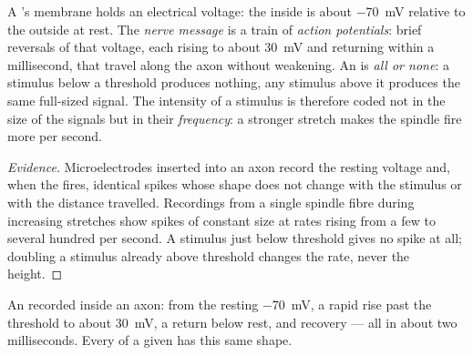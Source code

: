\begin{proposition}\label{prop:g12:stretch-reflex:actionpotential}
A 's membrane holds an electrical voltage: the inside is about
\qty{-70}{mV} relative to the outside at rest. The
\emph{nerve message} is a train of
\emph{action potentials}: brief reversals of
that voltage, each rising to about \qty{+30}{mV} and returning within
a millisecond, that travel along the axon without weakening. An  is \emph{all or none}: a stimulus below a threshold produces
nothing, any stimulus above it produces the same full-sized signal.
The intensity of a stimulus is therefore coded not in the size of the
signals but in their \emph{frequency}: a stronger stretch makes the
spindle fire more  per second.
\end{proposition}
\begin{proof}[Evidence]
Microelectrodes inserted into an axon record the resting voltage and,
when the  fires, identical spikes whose shape does not change with
the stimulus or with the distance travelled. Recordings from a single
spindle fibre during increasing stretches show spikes of constant
size at rates rising from a few to several hundred per second. A
stimulus just below threshold gives no spike at all; doubling a
stimulus already above threshold changes the rate, never the height.
\end{proof}

\begin{omfigure}

{\small An  recorded inside an axon: from the resting
\qty{-70}{mV}, a rapid rise past the threshold to about \qty{+30}{mV},
a return below rest, and recovery --- all in about two milliseconds.
Every  of a given  has this same shape.}
\end{omfigure}

